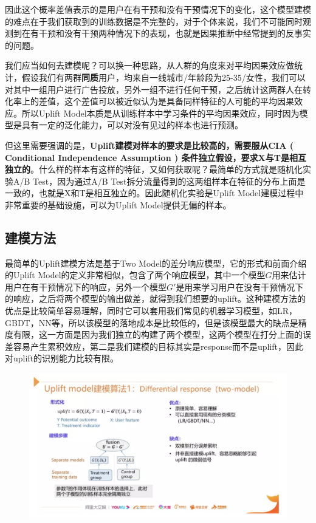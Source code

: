 \documentclass[12pt]{article}
\begin{document}
因此这个概率差值表示的是用户在有干预和没有干预情况下的变化，这个模型建模的难点在于我们获取到的训练数据是不完整的，对于个体来说，我们不可能同时观测到在有干预和没有干预两种情况下的表现，也就是因果推断中经常提到的反事实的问题。

我们应当如何去建模呢？可以换一种思路，从人群的角度来对平均因果效应做统计，假设我们有两群\textbf{同质}用户，均来自一线城市/年龄段为25-35/女性，我们可以对其中一组用户进行广告投放，另外一组不进行任何干预，之后统计这两群人在转化率上的差值，这个差值可以被近似认为是具备同样特征的人可能的平均因果效应。所以Uplift Model本质是从训练样本中学习条件的平均因果效应，同时因为模型是具有一定的泛化能力，可以对没有见过的样本也进行预测。

但这里需要强调的是，\textbf{Uplift建模对样本的要求是比较高的，需要服从CIA ( Conditional Independence Assumption ) 条件独立假设，要求X与T是相互独立的}。什么样的样本有这样的特征，又如何获取呢？最简单的方式就是随机化实验A/B Test，因为通过A/B Test拆分流量得到的这两组样本在特征的分布上面是一致的，也就是X和T是相互独立的。因此随机化实验是Uplift Model建模过程中非常重要的基础设施，可以为Uplift Model提供无偏的样本。



\subsection{建模方法}
最简单的Uplift建模方法是基于Two Model的差分响应模型，它的形式和前面介绍的Uplift Model的定义非常相似，包含了两个响应模型，其中一个模型$G$用来估计用户在有干预情况下的响应，另外一个模型$G'$是用来学习用户在没有干预情况下的响应，之后将两个模型的输出做差，就得到我们想要的uplift。这种建模方法的优点是比较简单容易理解，同时它可以套用我们常见的机器学习模型，如LR，GBDT，NN等，所以该模型的落地成本是比较低的，但是该模型最大的缺点是精度有限，这一方面是因为我们独立的构建了两个模型，这两个模型在打分上面的误差容易产生累积效应，第二是我们建模的目标其实是response而不是uplift，因此对uplift的识别能力比较有限。
\begin{figure}[H]
    \centering
    \includegraphics[width=1\textwidth]{fig/CasualInference-Uplift-Model-Two-Model.png}
\end{figure}
\end{document}
